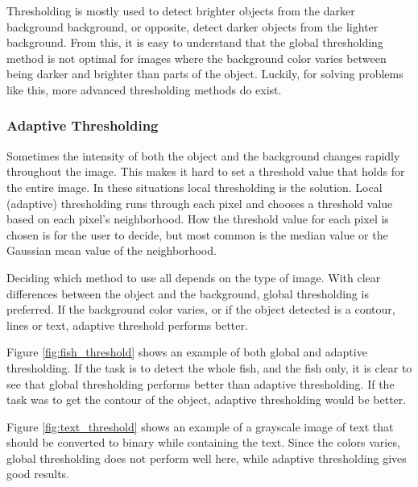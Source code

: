 Thresholding is mostly used to detect brighter objects from the darker background background, or opposite, detect darker objects from the lighter background.
From this, it is easy to understand that the global thresholding method is not optimal for images where the background color varies between being darker and brighter than parts of the object.
Luckily, for solving problems like this, more advanced thresholding methods do exist.


\subsubsection{Adaptive Thresholding}
Sometimes the intensity of both the object and the background changes rapidly throughout the image. This makes it hard to set a threshold value that holds for the entire image. In these situations local thresholding is the solution. Local (adaptive) thresholding runs through each pixel and chooses a threshold value based on each pixel's neighborhood. How the threshold value for each pixel is chosen is for the user to decide, but most common is the median value or the Gaussian mean value of the neighborhood.
\newline

Deciding which method to use all depends on the type of image. With clear differences between the object and the background, global thresholding is preferred. If the background color varies, or if the object detected is a contour, lines or text, adaptive threshold performs better.

Figure \ref{fig:fish_threshold} shows an example of both global and adaptive thresholding. If the task is to detect the whole fish, and the fish only, it is clear to see that global thresholding performs better than adaptive thresholding. If the task was to get the contour of the object, adaptive thresholding would be better. 

Figure \ref{fig:text_threshold} shows an example of a grayscale image of text that should be converted to binary while containing the text. Since the colors varies, global thresholding does not perform well here, while adaptive thresholding gives good results.


